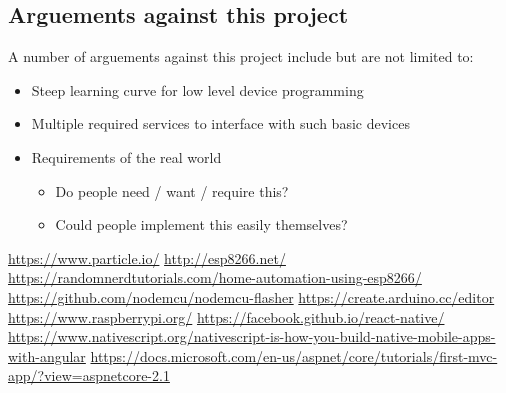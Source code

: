 \documentclass{article}
\begin{document}
            \subsection{Arguements against this project}
            A number of arguements against this project include but are not limited to:
            \begin{itemize}
                \item Steep learning curve for low level device programming
                \item Multiple required services to interface with such basic devices
                \item Requirements of the real world 
                \begin{itemize}
                    \item Do people need / want / require this?
                    \item Could people implement this easily themselves?
                \end{itemize}
            \end{itemize}
    \newpage

    \begin{thebibliography}
        \raggedright
            \url{https://www.particle.io/}
            \url{http://esp8266.net/}
            \url{https://randomnerdtutorials.com/home-automation-using-esp8266/}
            \url{https://github.com/nodemcu/nodemcu-flasher}
            \url{https://create.arduino.cc/editor}
            \url{https://www.raspberrypi.org/}
            \url{https://facebook.github.io/react-native/}
            \url{https://www.nativescript.org/nativescript-is-how-you-build-native-mobile-apps-with-angular}
            \url{https://docs.microsoft.com/en-us/aspnet/core/tutorials/first-mvc-app/?view=aspnetcore-2.1}
    \end{thebibliography}

    
\end{document}
